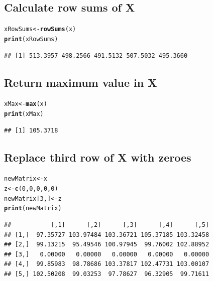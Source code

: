 \documentclass{article}\usepackage[]{graphicx}\usepackage[]{color}
\makeatletter
\newcommand{\hlnum}[1]{\textcolor[rgb]{0.686,0.059,0.569}{#1}}%
\newcommand{\hlstd}[1]{\textcolor[rgb]{0.345,0.345,0.345}{#1}}%
\newcommand{\hlkwb}[1]{\textcolor[rgb]{0.69,0.353,0.396}{#1}}%
\newcommand{\hlkwd}[1]{\textcolor[rgb]{0.737,0.353,0.396}{\textbf{#1}}}%
\newenvironment{kframe}{%
 \def\at@end@of@kframe{}%
 \ifinner\ifhmode%
  \def\at@end@of@kframe{\end{minipage}}%
  \begin{minipage}{\columnwidth}%
 \fi\fi%
 \def\FrameCommand##1{\hskip\@totalleftmargin \hskip-\fboxsep
 \colorbox{shadecolor}{##1}\hskip-\fboxsep
     \hskip-\linewidth \hskip-\@totalleftmargin \hskip\columnwidth}%
 \MakeFramed {\advance\hsize-\width
   \@totalleftmargin\z@ \linewidth\hsize
   \@setminipage}}%
 {\par\unskip\endMakeFramed%
 \at@end@of@kframe}
\newenvironment{knitrout}{}{} %
\makeatother
\begin{document}
\subsection{Calculate row sums of X}
\begin{knitrout}
\color{fgcolor}\begin{kframe}
\begin{alltt}
\hlstd{xRowSums} \hlkwb{<-} \hlkwd{rowSums}\hlstd{(x)}
\hlkwd{print}\hlstd{(xRowSums)}
\end{alltt}
\begin{verbatim}
## [1] 513.3957 498.2566 491.5132 507.5032 495.3660
\end{verbatim}
\end{kframe}
\end{knitrout}

\subsection{Return maximum value in X}
\begin{knitrout}
\color{fgcolor}\begin{kframe}
\begin{alltt}
\hlstd{xMax} \hlkwb{<-} \hlkwd{max}\hlstd{(x)}
\hlkwd{print}\hlstd{(xMax)}
\end{alltt}
\begin{verbatim}
## [1] 105.3718
\end{verbatim}
\end{kframe}
\end{knitrout}

\subsection{Replace third row of X with zeroes}
\begin{knitrout}
\color{fgcolor}\begin{kframe}
\begin{alltt}
\hlstd{newMatrix} \hlkwb{<-} \hlstd{x}
\hlstd{z} \hlkwb{<-} \hlkwd{c}\hlstd{(}\hlnum{0}\hlstd{,} \hlnum{0}\hlstd{,} \hlnum{0}\hlstd{,} \hlnum{0}\hlstd{,} \hlnum{0}\hlstd{)}
\hlstd{newMatrix[}\hlnum{3}\hlstd{, ]}\hlkwb{<-} \hlstd{z}
\hlkwd{print}\hlstd{(newMatrix)}
\end{alltt}
\begin{verbatim}
##           [,1]      [,2]      [,3]      [,4]      [,5]
## [1,]  97.35727 103.97484 103.36721 105.37185 103.32458
## [2,]  99.13215  95.49546 100.97945  99.76002 102.88952
## [3,]   0.00000   0.00000   0.00000   0.00000   0.00000
## [4,]  99.85983  98.78686 103.37817 102.47731 103.00107
## [5,] 102.50208  99.03253  97.78627  96.32905  99.71611
\end{verbatim}
\end{kframe}
\end{knitrout}
\end{document}
